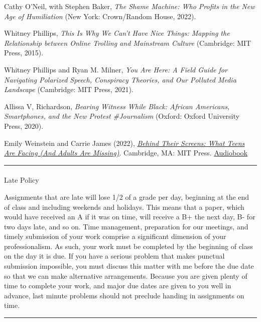 \documentclass[
  letterpaper,
  DIV=11,
  numbers=noendperiod,
  oneside]{scrartcl}
\makeatletter
\let\oldparagraph\paragraph
\renewcommand{\paragraph}{
    \@ifstar
      \xxxParagraphStar
      \xxxParagraphNoStar
  }
\newcommand{\xxxParagraphStar}[1]{\oldparagraph*{#1}\mbox{}}
\newcommand{\xxxParagraphNoStar}[1]{\oldparagraph{#1}\mbox{}}
\makeatother
\begin{document}
Cathy O'Neil, with Stephen Baker, \emph{The Shame Machine: Who Profits
in the New Age of Humiliation} (New York: Crown/Random House, 2022).

Whitney Phillips, \emph{This Is Why We Can't Have Nice Things: Mapping
the Relationship between Online Trolling and Mainstream Culture}
(Cambridge: MIT Press, 2015).

Whitney Phillips and Ryan M. Milner, \emph{You Are Here: A Field Guide
for Navigating Polarized Speech, Conspiracy Theories, and Our Polluted
Media Landscape} (Cambridge: MIT Press, 2021).

Allissa V, Richardson, \emph{Bearing Witness While Black: African
Americans, Smartphones, and the New Protest \#Journalism} (Oxford:
Oxford University Press, 2020).

Emily Weinstein and Carrie James (2022),
\href{https://direct.mit.edu/books/book/5363/Behind-Their-ScreensWhat-Teens-Are-Facing-and}{\emph{Behind
Their Screens: What Teens Are Facing (And Adults Are Missing)}}.
Cambridge, MA: MIT Press.
\href{https://www.audible.com/pd/Behind-Their-Screens-Audiobook/B0B322PXG1?action_code=ASSGB149080119000H&share_location=pdp}{Audiobook}

\begin{center}\rule{0.5\linewidth}{0.5pt}\end{center}

\paragraph{Late Policy}\label{late-policy}

Assignments that are late will lose 1/2 of a grade per day, beginning at
the end of class and including weekends and holidays. This means that a
paper, which would have received an A if it was on time, will receive a
B+ the next day, B- for two days late, and so on. Time management,
preparation for our meetings, and timely submission of your work
comprise a significant dimension of your professionalism. As such, your
work must be completed by the beginning of class on the day it is due.
If you have a serious problem that makes punctual submission impossible,
you must discuss this matter with me before the due date so that we can
make alternative arrangements. Because you are given plenty of time to
complete your work, and major due dates are given to you well in
advance, last minute problems should not preclude handing in assignments
on time.

\begin{center}\rule{0.5\linewidth}{0.5pt}\end{center}
\end{document}
